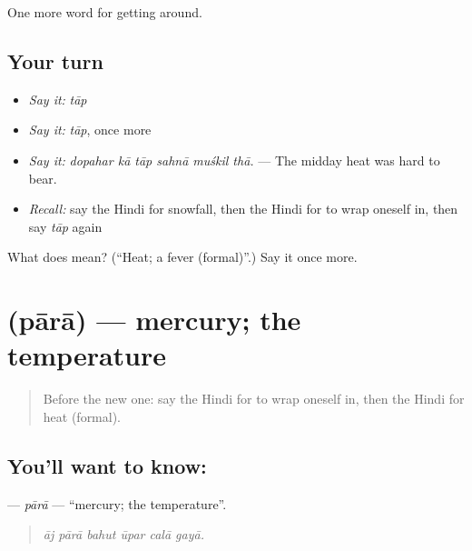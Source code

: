 \begin{grammarlens}[title={What you've built}]
One more word for getting around.
\end{grammarlens}

\subsection*{Your turn}
\begin{itemize}
\raggedright
  \item \emph{Say it:} \emph{tāp}
  \item \emph{Say it:} \emph{tāp}, once more
  \item \emph{Say it:} \emph{dopahar kā tāp sahnā muśkil thā.} — The midday heat was hard to bear.
  \item \emph{Recall:} say the Hindi for snowfall, then the Hindi for to wrap oneself in, then say \emph{tāp} again
\end{itemize}

\begin{tcolorbox}[breakable,colback=teal!4,colframe=teal!35!black,title={Before you move on}]
What does  mean? (\textquotedblleft{}Heat; a fever (formal)\textquotedblright{}.) Say it once more.
\end{tcolorbox}
\section[\texorpdfstring{\hi{पारा} (pārā)}{पारा (pārā)}]{ (pārā) — mercury; the temperature}

\label{lesson:HI-C439-para}



\begin{quote}
Before the new one: say the Hindi for to wrap oneself in, then the Hindi for heat (formal).
\end{quote}

\subsection*{You'll want to know: }
\textbf{} — \emph{pārā} — \textquotedblleft{}mercury; the temperature\textquotedblright{}.

\begin{quote}
     
\end{quote}

\begin{quote}
\emph{āj pārā bahut ūpar calā gayā.}
\end{quote}


